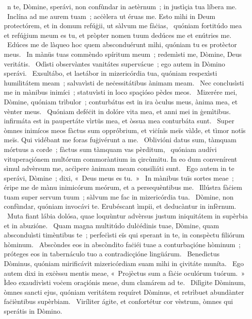 \psalmChapterWithInscription{}
{ }
{%
~n te, Dòmine, sperávi, non confùndar in aetèrnum~; in justìçia tua líbera me. 
~Inclína ad me aurem tuam~; acċèlera ut éruas me. Esto mìhi in Deum protectórem, et in domum refúġii, ut sàlvum me fàċias, 
~quóniam fortitúdo mea et refúġium meum es tu, et pròpter nomen tuum dedúces me et enútries me. 
~Edúces me de làqueo hoc quem absconduérunt mìhi, quóniam tu es protèctor meus. 
~In mànüs tuas commèndo spíritum meum~; redemìsti me, Dòmine, Deus veritátis. 
~Odìsti observàntes vanitátes supervácue~; ego autem in Dòmino sperávi. 
~Exsultábo, et laetábor in mizericórdia tua, quóniam respexìsti humilitátem meam~; salvavìsti de neċessitátibus ànimam meam. 
~Nec conclusìsti me in mànibus inimíci~; statuvìsti in loco spaçióso pèdes meos. 
~Mizerére mei, Dòmine, quóniam trìbulor~; conturbátus est in ira òculus meus, ànima mea, et vènter meus. 
~Quóniam deféċit in dolóre vita mea, et anni mei in ġemìtibus. infirmáta est in paupertáte vìrtüs mea, et òssua mea conturbáta sunt. 
~Super òmnes inimícos meos fàctus sum oppróbrium, et viċínïs meïs vàlde, et tìmor notïs meïs. Qui vidébant me foras fuġivérunt a me. 
~Oblivióni datus sum, tàmquam mórtuus a corde~; fàctus sum tàmquam vas pèrditum, 
~quóniam audívi vituperaçiónem multórum commoràntium in çircùmitu. In eo dum convenírent sìmul advèrsum me, acċìpere ànimam meam consiliáti sunt. 
~Ego autem in te sperávi, Dòmine~; dixi, «~Deus meus es tu.~»
~In mànibus tuïs sortes meae~; éripe me de mànu inimicórum meórum, et a persequèntibus me. 
~Illústra fàċiem tuam super servum tuum~; sàlvum me fac in mizericórdia tua. 
~Dòmine, non confùndar, quóniam invocávi te. Erubéscant ìmpii, et deducàntur in infèrnum. 
~Muta fiant lábia dolósa, quae loquùntur advèrsus justum iniquitátem in supèrbia et in abuzióne. 
~Quam magna multitúdo dulċédinis tuae, Dòmine, quam absconduìsti timèntibus te~; perfeċìsti eïs qui sperant in te, in conspèctu filiórum hòminum. 
~Abscòndes eos in abscòndito faċiéi tuae a conturbaçióne hòminum~; próteges eos in tabernáculo tuo a contradicçióne lingüárum. 
~Benedìctus Dòminus, quóniam mirificávit mizericórdiam suam mìhi in çivitáte muníta. 
~Ego autem dixi in exċèssu mentis meae, «~Projèctus sum a fàċie oculórum tuórum.~» Ìdeo exaudivìsti voċem oraçiónis meae, dum clamárem ad te. 
~Dilìgite Dòminum, òmnes sancti ejus, quóniam veritátem requíret Dòminus, et retrìbuet abundànter faċièntibus supèrbiam. 
~Viríliter ágite, et confortétur cor vèstrum, òmnes qui sperátis in Dòmino. 
}
